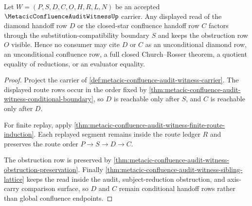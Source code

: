 \begin{theorem}
\label{thm:metacic-confluence-audit-witness-substitution-boundary-factorization}
Let $W=(P,S,D,C,O,H,R,L,N)$ be an accepted $\MetacicConfluenceAuditWitnessUp$ carrier. Any displayed read of the diamond handoff row $D$ or the closed-star confluence handoff row $C$ factors through the substitution-compatibility boundary $S$ and keeps the obstruction row $O$ visible. Hence no consumer may cite $D$ or $C$ as an unconditional diamond row, an unconditional confluence row, a full closed Church--Rosser theorem, a quotient equality of reductions, or an evaluator equality.
\end{theorem}
\begin{proof}
Project the carrier of \autoref{def:metacic-confluence-audit-witness-carrier}. The displayed route rows occur in the order fixed by \autoref{thm:metacic-confluence-audit-witness-conditional-boundary}, so $D$ is reachable only after $S$, and $C$ is reachable only after $D$.

For finite replay, apply \autoref{thm:metacic-confluence-audit-witness-finite-route-induction}. Each replayed segment remains inside the route ledger $R$ and preserves the route order $P \to S \to D \to C$.

The obstruction row is preserved by \autoref{thm:metacic-confluence-audit-witness-obstruction-preservation}. Finally \autoref{thm:metacic-confluence-audit-witness-sibling-lattice} keeps the read inside the audit, subject-reduction obstruction, and axis-carry comparison surface, so $D$ and $C$ remain conditional handoff rows rather than global confluence endpoints.
\end{proof}

